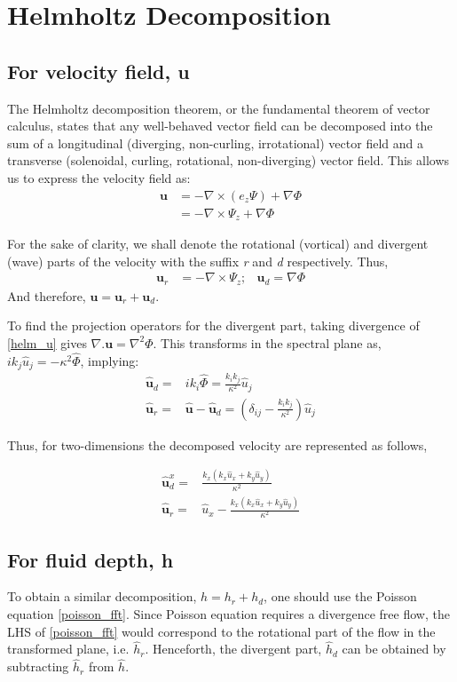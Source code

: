 \documentclass[a4paper,12pt]{paper}
\begin{document}
\section{Helmholtz Decomposition}
\subsection{For velocity field, u}
The Helmholtz decomposition theorem, or the fundamental theorem of vector 
calculus, 
states that any well-behaved vector field can be decomposed into
the sum of a longitudinal (diverging, non-curling, irrotational) vector field 
and 
a transverse (solenoidal, curling, rotational, non-diverging) vector field. 
This allows us to express the velocity field as:
\begin{align}
\label{helm_u}
\mathbf u & = -\nabla \times (e_z \Psi) + \nabla \Phi\\
	& =  -\nabla \times \Psi_z + \nabla \Phi
\end{align}

For the sake of clarity,
we shall denote the rotational (vortical) and divergent (wave) parts of the 
velocity with the suffix \emph{r} and \emph{d} respectively. Thus,
\begin{align}
\mathbf u_r & = -\nabla \times \Psi_z ; &\mathbf u_d =   \nabla \Phi
\end{align}
And therefore, $\mathbf u  = \mathbf u_r + \mathbf u_d$.

To find the projection operators for the divergent part, taking divergence of 
\eqref{helm_u} gives $\nabla .\mathbf{u} = \nabla^2 \Phi
$.
This transforms in the spectral plane as, $ik_j \hat{u}_j = -\kappa^2 
\hat{\Phi}$, implying:
\begin{align}
\mathbf{\hat{u}}_d =& ik_i \hat{\Phi} = \frac{k_i k_j}{\kappa^2} \hat{u}_j\\
\mathbf{\hat{u}}_r =& \mathbf{\hat{u}} - \mathbf{\hat{u}}_d = \left( \delta_{ij} 
- \frac{k_i k_j}{\kappa^2} \right) \hat{u}_j
\end{align}

Thus, for two-dimensions the decomposed velocity are represented as follows,

\begin{align}
\mathbf{\hat{u}}_d^x =& \frac{k_x (k_x \hat{u}_x + k_y \hat{u}_y)}{\kappa^2} \\
\mathbf{\hat{u}}_r =& \hat{u}_{x} - \frac{k_x  (k_x \hat{u}_x + k_y \hat{u}_y)}{\kappa^2} 
\end{align}

\subsection{For fluid depth, h}
To obtain a similar decomposition, $h = h_r + h_d$, one should use the Poisson 
equation \eqref{poisson_fft}.
Since Poisson equation requires a divergence free flow, the LHS of 
\eqref{poisson_fft} would correspond to the rotational part of the flow in the 
transformed plane, i.e. $\hat{h}_r$. Henceforth, the divergent part, $\hat{h}_d$ 
can be obtained by subtracting $\hat{h}_r$ from $\hat{h}$.
\end{document}
